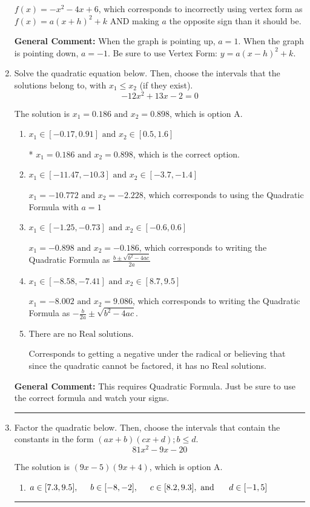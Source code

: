 \documentclass{extbook}[14pt]
\newcommand{\litem}[1]{\item #1

\rule{\textwidth}{0.4pt}}
\begin{document}
\begin{enumerate}
{\begin{enumerate}[label=\Alph*.]
$f(x)=-x^{2} -4 x + 6$, which corresponds to incorrectly using vertex form as $f(x) = a(x+h)^2+k$ AND making $a$ the opposite sign than it should be.
\end{enumerate}

\textbf{General Comment:} When the graph is pointing up, $a=1$. When the graph is pointing down, $a=-1$. Be sure to use Vertex Form: $y = a(x-h)^2+k$.
}
\litem{
Solve the quadratic equation below. Then, choose the intervals that the solutions belong to, with $x_1 \leq x_2$ (if they exist).
\[ -12x^{2} +13 x -2 = 0 \]

The solution is \( x_1 = 0.186 \text{ and } x_2 = 0.898 \), which is option A.\begin{enumerate}[label=\Alph*.]
\item \( x_1 \in [-0.17, 0.91] \text{ and } x_2 \in [0.5, 1.6] \)

* $x_1 = 0.186 \text{ and } x_2 = 0.898$, which is the correct option.
\item \( x_1 \in [-11.47, -10.3] \text{ and } x_2 \in [-3.7, -1.4] \)

 $x_1 = -10.772 \text{ and } x_2 = -2.228$, which corresponds to using the Quadratic Formula with $a=1$
\item \( x_1 \in [-1.25, -0.73] \text{ and } x_2 \in [-0.6, 0.6] \)

 $x_1 = -0.898 \text{ and } x_2 = -0.186$, which corresponds to writing the Quadratic Formula as $\frac{b \pm \sqrt{b^2 - 4ac}}{2a}$
\item \( x_1 \in [-8.58, -7.41] \text{ and } x_2 \in [8.7, 9.5] \)

 $x_1 = -8.002 \text{ and } x_2 = 9.086$, which corresponds to writing the Quadratic Formula as $-\frac{b}{2a} \pm \sqrt{b^2 - 4ac}$.
\item \( \text{There are no Real solutions.} \)

Corresponds to getting a negative under the radical or believing that since the quadratic cannot be factored, it has no Real solutions.
\end{enumerate}

\textbf{General Comment:} This requires Quadratic Formula. Just be sure to use the correct formula and watch your signs.
}
\litem{
Factor the quadratic below. Then, choose the intervals that contain the constants in the form $(ax+b)(cx+d); b \leq d.$
\[ 81x^{2} -9 x -20 \]

The solution is \( (9x -5)(9x + 4) \), which is option A.\begin{enumerate}[label=\Alph*.]
\item \( a \in [7.3, 9.5], \hspace*{5mm} b \in [-8, -2], \hspace*{5mm} c \in [8.2, 9.3], \text{ and } \hspace*{5mm} d \in [-1, 5] \)


\end{enumerate}}
\end{enumerate}
\end{document}
